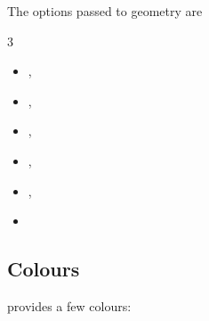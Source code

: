 The options passed to geometry are
\begin{multicols}{3}
    \begin{itemize}
        \item {},
        \item {},
        \item {},
        \item {},
        \item {},
        \item {}
    \end{itemize}
\end{multicols}


\subsection{Colours}

\prettytex{} provides a few colours:

